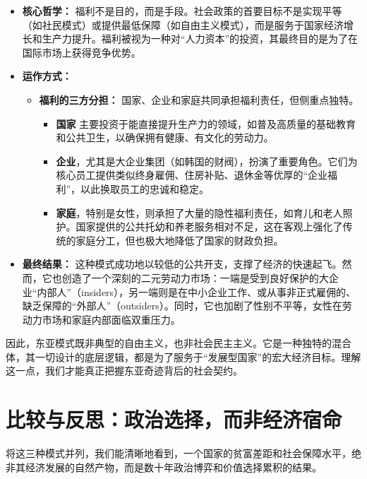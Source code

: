 \documentclass[a5paper, 11pt, openany]{ctexbook}
\begin{document}
\begin{itemize}
    \item \textbf{核心哲学：} 福利不是目的，而是手段。社会政策的首要目标不是实现平等（如社民模式）或提供最低保障（如自由主义模式），而是服务于国家经济增长和生产力提升。福利被视为一种对“人力资本”的投资，其最终目的是为了在国际市场上获得竞争优势。
    \item \textbf{运作方式：}
    \begin{itemize}
        \item \textbf{福利的三方分担：} 国家、企业和家庭共同承担福利责任，但侧重点独特。
        \begin{itemize}
            \item \textbf{国家} 主要投资于能直接提升生产力的领域，如普及高质量的基础教育和公共卫生，以确保拥有健康、有文化的劳动力。
            \item \textbf{企业}，尤其是大企业集团（如韩国的财阀），扮演了重要角色。它们为核心员工提供类似终身雇佣、住房补贴、退休金等优厚的“企业福利”，以此换取员工的忠诚和稳定。
            \item \textbf{家庭}，特别是女性，则承担了大量的隐性福利责任，如育儿和老人照护。国家提供的公共托幼和养老服务相对不足，这在客观上强化了传统的家庭分工，但也极大地降低了国家的财政负担。
        \end{itemize}
    \end{itemize}
    \item \textbf{最终结果：} 这种模式成功地以较低的公共开支，支撑了经济的快速起飞。然而，它也创造了一个深刻的二元劳动力市场：一端是受到良好保护的大企业“内部人”（insiders），另一端则是在中小企业工作、或从事非正式雇佣的、缺乏保障的“外部人”（outsiders）。同时，它也加剧了性别不平等，女性在劳动力市场和家庭内部面临双重压力。
\end{itemize}

因此，东亚模式既非典型的自由主义，也非社会民主主义。它是一种独特的混合体，其一切设计的底层逻辑，都是为了服务于“发展型国家”的宏大经济目标。理解这一点，我们才能真正把握东亚奇迹背后的社会契约。

\section{比较与反思：政治选择，而非经济宿命}

将这三种模式并列，我们能清晰地看到，一个国家的贫富差距和社会保障水平，绝非其经济发展的自然产物，而是数十年政治博弈和价值选择累积的结果。
\end{document}

